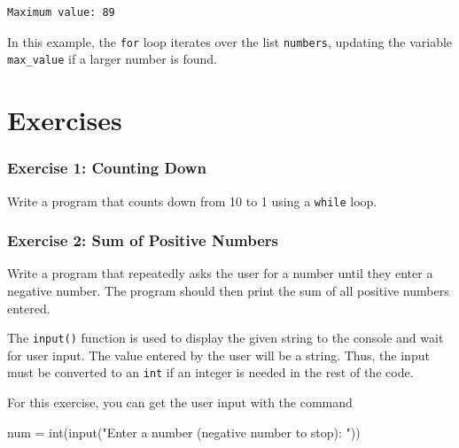 \documentclass[
  letterpaper,
  DIV=11,
  numbers=noendperiod]{scrreprt}
\newenvironment{Shaded}{\begin{snugshade}}{\end{snugshade}}
\newcommand{\BuiltInTok}[1]{\textcolor[rgb]{0.00,0.23,0.31}{#1}}
\newcommand{\NormalTok}[1]{\textcolor[rgb]{0.00,0.23,0.31}{#1}}
\newcommand{\OperatorTok}[1]{\textcolor[rgb]{0.37,0.37,0.37}{#1}}
\newcommand{\StringTok}[1]{\textcolor[rgb]{0.13,0.47,0.30}{#1}}
\begin{document}
\begin{verbatim}
Maximum value: 89
\end{verbatim}

In this example, the \texttt{for} loop iterates over the list
\texttt{numbers}, updating the variable \texttt{max\_value} if a larger
number is found.

\hypertarget{exercises-3}{%
\section{Exercises}\label{exercises-3}}

\hypertarget{exercise-1-counting-down}{%
\subsubsection{Exercise 1: Counting
Down}\label{exercise-1-counting-down}}

Write a program that counts down from 10 to 1 using a \texttt{while}
loop.

\hypertarget{exercise-2-sum-of-positive-numbers}{%
\subsubsection{Exercise 2: Sum of Positive
Numbers}\label{exercise-2-sum-of-positive-numbers}}

Write a program that repeatedly asks the user for a number until they
enter a negative number. The program should then print the sum of all
positive numbers entered.

\begin{tcolorbox}[enhanced jigsaw, coltitle=black, colback=white, bottomrule=.15mm, arc=.35mm, titlerule=0mm, opacitybacktitle=0.6, toptitle=1mm, left=2mm, toprule=.15mm, opacityback=0, bottomtitle=1mm, title=\textcolor{quarto-callout-note-color}{\faInfo}\hspace{0.5em}{\texttt{input()}}, rightrule=.15mm, colframe=quarto-callout-note-color-frame, breakable, colbacktitle=quarto-callout-note-color!10!white, leftrule=.75mm]

The \texttt{input()} function is used to display the given string to the
console and wait for user input. The value entered by the user will be a
string. Thus, the input must be converted to an \texttt{int} if an
integer is needed in the rest of the code.

For this exercise, you can get the user input with the command

\begin{Shaded}
\begin{Highlighting}[]
\NormalTok{num }\OperatorTok{=} \BuiltInTok{int}\NormalTok{(}\BuiltInTok{input}\NormalTok{(}\StringTok{"Enter a number (negative number to stop): "}\NormalTok{))}
\end{Highlighting}
\end{Shaded}

\end{tcolorbox}
\end{document}

